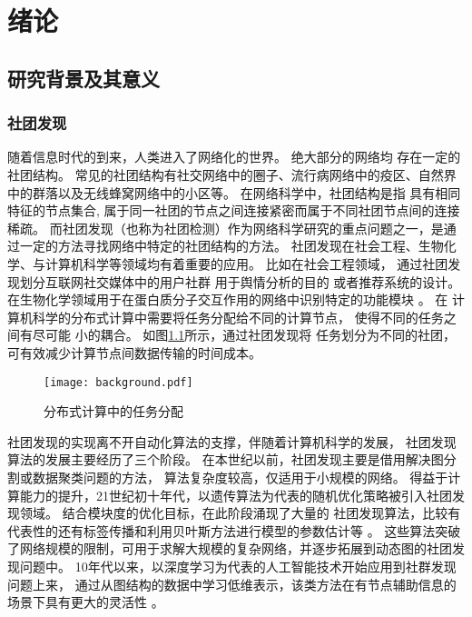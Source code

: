 
\chapter{绪论}


\section{研究背景及其意义}
\subsection{社团发现}
随着信息时代的到来，人类进入了网络化的世界。
绝大部分的网络均
存在一定的社团结构\cite{wang2012network}。
常见的社团结构有社交网络中的圈子、流行病网络中的疫区、自然界中的群落以及无线蜂窝网络中的小区等。
在网络科学中，社团结构是指
具有相同特征的节点集合, 属于同一社团的节点之间连接紧密而属于不同社团节点间的连接稀疏。
而社团发现（也称为社团检测）作为网络科学研究的重点问题之一，是通过一定的方法寻找网络中特定的社团结构的方法。
社团发现在社会工程、生物化学、与计算机科学等领域均有着重要的应用。
比如在社会工程领域，
通过社团发现划分互联网社交媒体中的用户社群\cite{zalmout2013twitter}
用于舆情分析的目的\cite{yang2018opinion}
或者推荐系统的设计\cite{cao2015recommendation}。
在生物化学领域用于在蛋白质分子交互作用的网络中识别特定的功能模块 \cite{ayati2015mobas}。
在
计算机科学的分布式计算中需要将任务分配给不同的计算节点，
使得不同的任务之间有尽可能
小的耦合\cite{topcuoglu2002performance}。
如图\ref{fig:distributed_computing}所示，通过社团发现将
任务划分为不同的社团，可有效减少计算节点间数据传输的时间成本。

\begin{figure}[!ht]
    \centering
    \texttt{[image: background.pdf]}
    \caption{分布式计算中的任务分配\protect\footnotemark}
    \label{fig:distributed_computing}
\end{figure}


社团发现的实现离不开自动化算法的支撑，伴随着计算机科学的发展，
社团发现算法的发展主要经历了三个阶段。
在本世纪以前，社团发现主要是借用解决图分割或数据聚类问题的方法，
算法复杂度较高，仅适用于小规模的网络。
得益于计算能力的提升，21世纪初十年代，以遗传算法为代表的随机优化策略被引入社团发现领域。
结合模块度的优化目标，在此阶段涌现了大量的
社团发现算法，比较有代表性的还有标签传播和利用贝叶斯方法进行模型的参数估计等 \cite{fortunato2010community}。
这些算法突破了网络规模的限制，可用于求解大规模的复杂网络，并逐步拓展到动态图的社团发现问题中。
10年代以来，以深度学习为代表的人工智能技术开始应用到社群发现问题上来，
通过从图结构的数据中学习低维表示，该类方法在有节点辅助信息的场景下具有更大的灵活性
\cite{Su_2022}。

